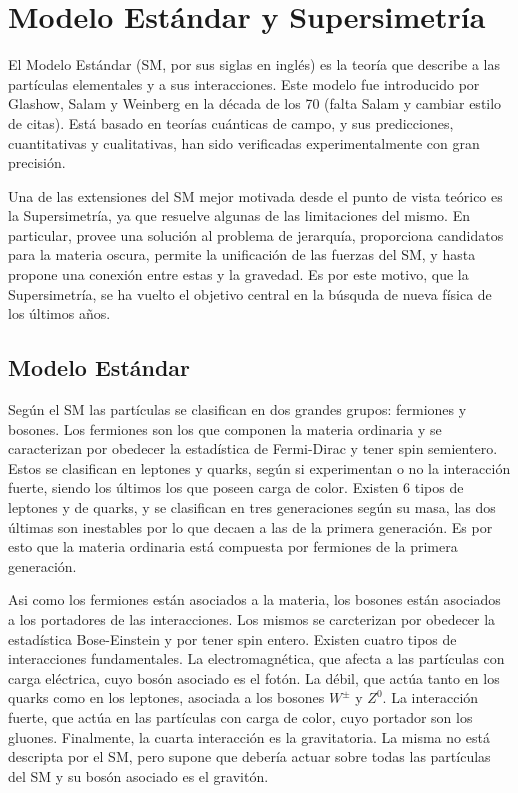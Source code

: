 \chapter{Modelo Estándar y Supersimetría}

El Modelo Estándar (SM, por sus siglas en inglés) es la teoría que describe a las partículas elementales y a sus interacciones. Este modelo fue introducido por Glashow, Salam y Weinberg en la década de los 70 \cite{Glashow:1961tr,PhysRevLett.19.1264} (falta Salam y cambiar estilo de citas). Está basado en teorías cuánticas de campo, y sus predicciones, cuantitativas y cualitativas, han sido verificadas experimentalmente con gran precisión.

Una de las extensiones del SM mejor motivada desde el punto de vista teórico es la Supersimetría, ya que resuelve algunas de las limitaciones del mismo. En particular, provee una solución al problema de jerarquía, proporciona candidatos para la materia oscura, permite la unificación de las fuerzas del SM, y hasta propone una conexión entre estas y la gravedad. Es por este motivo, que la Supersimetría, se ha vuelto el objetivo central en la búsquda de nueva física de los últimos años.

\section{Modelo Estándar}
 
Según el SM las partículas se clasifican en dos grandes grupos: fermiones y bosones. Los fermiones son los que componen la materia ordinaria y se caracterizan por obedecer la estadística de Fermi-Dirac y tener spin semientero. Estos se clasifican en leptones y quarks, según si experimentan o no la interacción fuerte, siendo los últimos los que poseen carga de color.  Existen 6 tipos de leptones y de quarks, y se clasifican en tres generaciones según su masa, las dos últimas son inestables por lo que decaen a las de la primera generación. Es por esto que la materia ordinaria está compuesta por fermiones de la primera generación. 

Asi como los fermiones están asociados a la materia, los bosones están asociados a los portadores de las interacciones. Los mismos se carcterizan por obedecer la estadística Bose-Einstein y por tener spin entero. Existen cuatro tipos de interacciones fundamentales. La electromagnética, que afecta a las partículas con carga eléctrica, cuyo bosón asociado es el fotón. La débil, que actúa tanto en los quarks como en los leptones, asociada a los bosones $W^{\pm}$ y $Z^{0}$. La interacción fuerte, que actúa en las partículas con carga de color, cuyo portador son los gluones. Finalmente, la cuarta interacción es la gravitatoria. La misma no está descripta por el SM, pero supone que debería actuar sobre todas las partículas del SM y su bosón asociado es el gravitón. 

